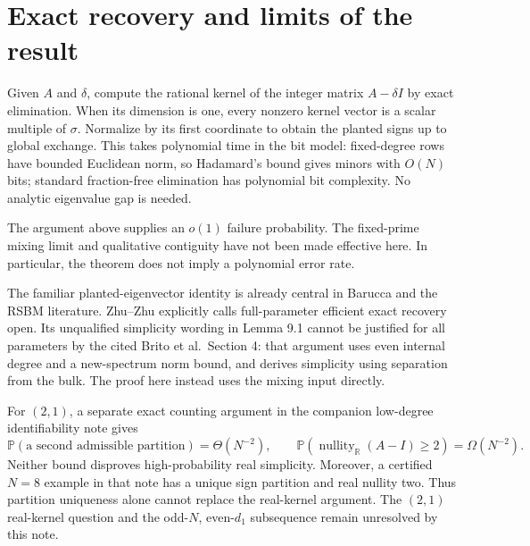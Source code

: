 \documentclass[11pt]{article}
\newcommand{\Prob}{\mathbb P}
\newcommand{\nullity}{\operatorname{nullity}}
\begin{document}
\section{Exact recovery and limits of the result}
Given $A$ and $\delta$, compute the rational kernel of the integer matrix $A-\delta I$ by exact elimination. When its dimension is one, every nonzero kernel vector is a scalar multiple of $\sigma$. Normalize by its first coordinate to obtain the planted signs up to global exchange. This takes polynomial time in the bit model: fixed-degree rows have bounded Euclidean norm, so Hadamard's bound gives minors with $O(N)$ bits; standard fraction-free elimination has polynomial bit complexity. No analytic eigenvalue gap is needed.

The argument above supplies an $o(1)$ failure probability. The fixed-prime mixing limit and qualitative contiguity have not been made effective here. In particular, the theorem does not imply a polynomial error rate.

The familiar planted-eigenvector identity is already central in Barucca and the RSBM literature. Zhu--Zhu \cite[Section 1.3]{zz} explicitly calls full-parameter efficient exact recovery open. Its unqualified simplicity wording in Lemma 9.1 cannot be justified for all parameters by the cited Brito et al.\ Section 4: that argument uses even internal degree and a new-spectrum norm bound, and derives simplicity using separation from the bulk. The proof here instead uses the mixing input directly.

For $(2,1)$, a separate exact counting argument in the companion low-degree
identifiability note gives
\[
 \Prob(\text{a second admissible partition})=\Theta(N^{-2}),
 \qquad
 \Prob(\nullity_{\mathbb R}(A-I)\ge2)=\Omega(N^{-2}).
\]
Neither bound disproves high-probability real simplicity. Moreover, a certified $N=8$ example in that note has a unique sign partition and real nullity two. Thus partition uniqueness alone cannot replace the real-kernel argument. The $(2,1)$ real-kernel question and the odd-$N$, even-$d_1$ subsequence remain unresolved by this note.
\end{document}
